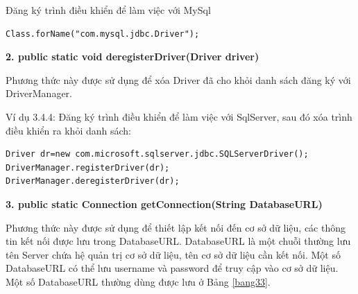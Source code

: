  Đăng ký trình điều khiển để làm việc với MySql
\lstset{language=Java}
\begin{lstlisting}[escapechar=`]
Class.forName("com.mysql.jdbc.Driver");
\end{lstlisting}

\textbf{2. public static void deregisterDriver(Driver driver)}

Phương thức này được sử dụng để xóa Driver đã cho khỏi danh sách đăng ký với DriverManager.

Ví dụ 3.4.4: Đăng ký trình điều khiển để làm việc với SqlServer, sau đó xóa trình điều khiển ra khỏi danh sách:

\lstset{language=Java}
\begin{lstlisting}[escapechar=`]
Driver dr=new com.microsoft.sqlserver.jdbc.SQLServerDriver();
DriverManager.registerDriver(dr);
DriverManager.deregisterDriver(dr);
\end{lstlisting}
\textbf{3. public static Connection getConnection(String DatabaseURL)}

Phương thức này được sử dụng để thiết lập kết nối đến cơ sở dữ liệu, các thông tin kết nối được lưu trong DatabaseURL. DatabaseURL là một chuỗi thường lưu tên Server chứa hệ quản trị cơ sở dữ liệu, tên cơ sở dữ liệu cần kết nối. Một số DatabaseURL có thể lưu  username và password để truy cập vào cơ sở dữ liệu. Một số DatabaseURL thường dùng được lưu ở Bảng \ref{bang33}.


